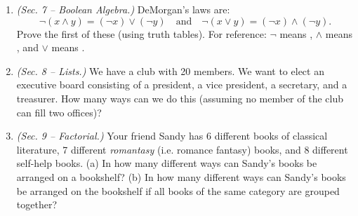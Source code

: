 \documentclass[10pt]{beamer}
\begin{document}
\begin{frame}
 \begin{myredbox}[title=Weekly Quiz \#3] 
\begin{enumerate}
	\item  \textit{(Sec. 7 -- Boolean Algebra.)} DeMorgan's laws are:
	\[ \lnot (x \land y) = (\lnot x) \lor (\lnot y) \quad \text{and} \quad \lnot (x \lor y) = (\lnot x) \land (\lnot y). \]
	Prove the first of these (using truth tables). For reference: $\lnot$ means , $\land$ means , and $\lor$ means .
	\item  \textit{(Sec. 8 -- Lists.)}  We have a club with 20 members. We want to elect an executive board consisting of a president, a vice president, a secretary, and a treasurer.  How many ways can we do this (assuming no member of the club can fill two offices)?
    \item \textit{(Sec. 9 -- Factorial.)}
Your friend Sandy has 6 different books of classical literature,  7 different \textit{romantasy} (i.e. romance fantasy) books, and 8 different self-help books. (a) In how many different ways can Sandy's books be arranged on a bookshelf? (b) In how many different ways can Sandy's books be arranged on the bookshelf if all books of the same category are grouped together? 
\end{enumerate}
\end{myredbox}


\end{frame}
\end{document}
